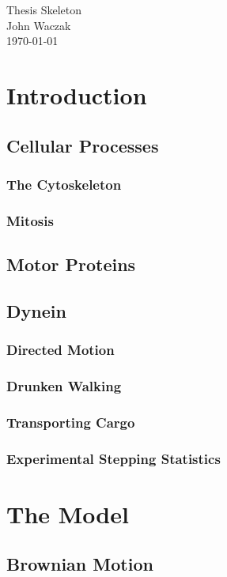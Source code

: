 \documentclass{article}
\begin{document}
\begin{centering}
  \Huge{Thesis Skeleton}\\
  \normalsize{John Waczak\\
  \today \\}
\end{centering}

\tableofcontents

\section{Introduction}
\subsection{Cellular Processes}
\subsubsection{The Cytoskeleton}
\subsubsection{Mitosis} 
\subsection{Motor Proteins}
\subsection{Dynein}
\subsubsection{Directed Motion}
\subsubsection{Drunken Walking}
\subsubsection{Transporting Cargo}
\subsubsection{Experimental Stepping Statistics} 


\section{The Model} 
\subsection{Brownian Motion}
\end{document}
